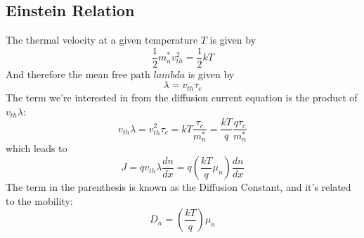 \subsection{Einstein Relation}
The thermal velocity at a given temperature $T$ is given by
    \begin{equation}
        {\frac{1}{2}}m_n^*v_{th}^2 = {\frac{1}{2}}kT
    \end{equation}
And therefore the mean free path $lambda$ is given by
    \begin{equation}
        \lambda  = {v_{th}}{\tau _c}
    \end{equation}
The term we're interested in from the diffusion current equation is the product of $v_{th} \lambda$:
    \begin{equation}
        {v_{th}}\lambda  = v_{th}^2{\tau _c} = kT\frac{{{\tau _c}}}{{m_n^*}} = \frac{{kT}}{q}\frac{{q{\tau _c}}}{{m_n^*}}
    \end{equation}
which leads to
    \begin{equation}
        J = q{v_{th}}\lambda \frac{{dn}}{{dx}} = q\left( {\frac{{kT}}{q}{\mu _n}} \right)\frac{{dn}}{{dx}}
    \end{equation}
The term in the parenthesis is known as the Diffusion Constant, and it's related to the mobility: 
    \begin{equation}
        {D_n} = \left( {\frac{{kT}}{q}} \right){\mu _n}
    \end{equation}
